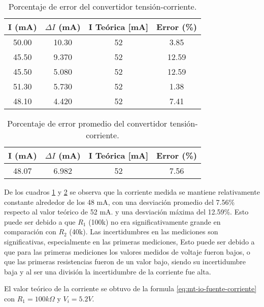\begin{table}[h!]
\centering
\begin{tabular}{|c|c|c|c|}
\hline
I (mA) & \(\Delta I\) (mA) & I Teórica [mA] & Error (\%) \\ \hline
50.00 & 10.30 & 52 & 3.85 \\ \hline
45.50 & 9.370 & 52 & 12.59 \\ \hline
45.50 & 5.080 & 52 & 12.59 \\ \hline
51.30 & 5.730 & 52 & 1.38 \\ \hline
48.10 & 4.420 & 52 & 7.41 \\ \hline
\end{tabular}
\caption{Porcentaje de error del convertidor tensión-corriente.}
\label{tab:analisis-resultados-convertidor-tension-corriente}
\end{table}

\begin{table}[h!]
\centering
\begin{tabular}{|c|c|c|c|}
\hline
I (mA) & \(\Delta I\) (mA) & I Teórica [mA] & Error (\%) \\ \hline
48.07 & 6.982 & 52 & 7.56 \\ \hline
\end{tabular}
\caption{Porcentaje de error promedio del convertidor tensión-corriente.}
\label{tab:analisis-resultados-convertidor-tension-corriente-promedio}
\end{table}

De los cuadros \ref{tab:analisis-resultados-convertidor-tension-corriente} y \ref{tab:analisis-resultados-convertidor-tension-corriente-promedio} se observa que la corriente medida se mantiene relativamente constante alrededor de los 48 mA, con una desviación promedio del 7.56\% respecto al valor teórico de 52 mA. y una desviación máxima del 12.59\%. Esto puede ser debido a que $R_1$ (100k) no era significativamente grande en comparación con $R_2$ (40k). Las incertidumbres en las mediciones son significativas, especialmente en las primeras mediciones, Esto puede ser debido a que para las primeras mediciones los valores medidos de voltaje fueron bajos, o que las primeras resistencias fueron de un valor bajo, siendo su incertidumbre baja y al ser una división la incertidumbre de la corriente fue alta.

El valor teórico de la corriente se obtuvo de la formula \ref{eq:mt-io-fuente-corriente} con $R_1 = 100k\Omega$ y $V_i = 5.2V$.